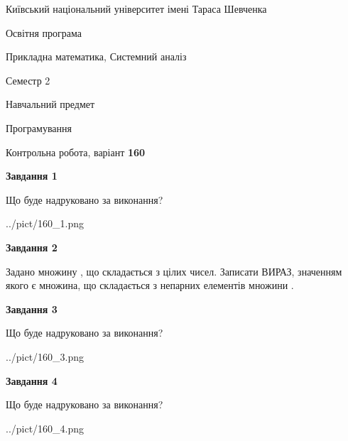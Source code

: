 \documentclass[12pt, ukrainian]{article}
\begin{document}
{{\begin {small}\par
{ \center  Київський національний університет імені Тараса Шевченка \par}
{\parbox {5 cm}{Освітня програма \hfill}{\parbox {8 cm}{Прикладна математика, Системний аналіз \hfill}}\parbox {5 cm}{\hfill Семестр 2}}\par
{\parbox {5 cm} {Навчальний предмет \hfill}\parbox {7 cm}{Програмування \hfill}\parbox {6cm}{\hfill}\par}\vspace{-7pt} \end{small}}{\center Контрольна робота, варіант  \No \textbf
{ 160 }\par}}
{
\begin {large}
{\begin {center}\textbf{Завдання 1}\end {center}}\par
Що буде надруковано за виконання?\par\par
\begin{center}
	{../pict/160_1.png}
\end{center}
\newpage

{\begin {center}\textbf{Завдання 2}\end {center}}\par
Задано множину , що складається з цілих чисел. Записати ВИРАЗ, значенням якого є множина, що складається  з непарних елементів множини .\par
\newpage

{\begin {center}\textbf{Завдання 3}\end {center}}\par
Що буде надруковано за виконання?
\begin{center}
	{../pict/160_3.png}
\end{center}
\newpage

{\begin {center}\textbf{Завдання 4}\end {center}}\par
Що буде надруковано за виконання?\par
\begin{center}
	{../pict/160_4.png}
\end{center}
\newpage


\end{large}}
\end{document}
